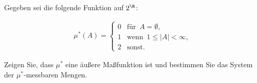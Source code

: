 \begin{exercise}

Gegeben sei die folgende Funktion auf $2^\R$:

\begin{align*}
  \mu^\ast(A) =
  \begin{cases}
    0 & \text{für} \enspace A = \emptyset, \\
    1 & \text{wenn} \enspace 1 \leq |A| < \infty, \\
    2 & \text{sonst}.
  \end{cases}
\end{align*}

Zeigen Sie, dass $\mu^\ast$ eine äußere Maßfunktion ist und bestimmen Sie das System der $\mu^\ast$-messbaren Mengen.

\end{exercise}


